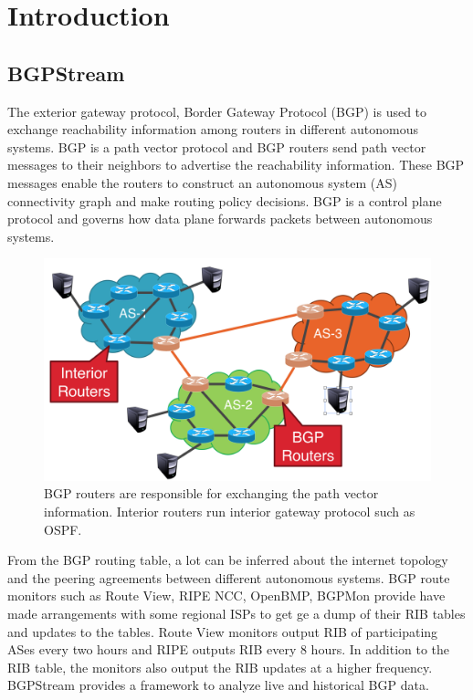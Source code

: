  \section{Introduction}\label{sec:introduction}
  \subsection{BGPStream}
 The exterior gateway protocol, Border Gateway Protocol (BGP) is used to exchange reachability information among routers in different autonomous systems. BGP is a path vector protocol and BGP routers send path vector messages to their neighbors to advertise the reachability information. These BGP messages enable the routers to construct an autonomous system (AS) connectivity graph and make routing policy decisions. BGP is a control plane protocol and governs how data plane forwards packets between autonomous systems. 
 \begin{figure}[!htbp]
	\includegraphics[scale=0.4]{Interior_and_BGP_routers.png}
	\caption{BGP routers are responsible for exchanging the path vector information. Interior routers run interior gateway protocol such as OSPF.}
	\label{a:label}
\end{figure}
From the BGP routing table, a lot can be inferred about the internet topology and the peering agreements between different autonomous systems. BGP route monitors such as Route View, RIPE NCC, OpenBMP, BGPMon provide have made arrangements with some regional ISPs to get ge a dump of their RIB tables and updates to the tables. Route View monitors output RIB of participating ASes every two hours and RIPE outputs RIB every 8 hours. In addition to the RIB table, the monitors also output the RIB updates at a higher frequency.  BGPStream provides a framework to analyze live and historical BGP data.  
